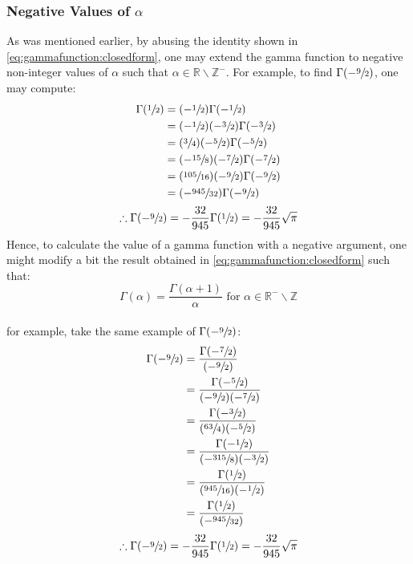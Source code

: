 \documentclass[12pt]{article}
\begin{document}
\subsubsection{Negative Values of $\alpha$}
As was mentioned earlier, by abusing the identity shown in \autoref{eq:gammafunction:closedform}, one may extend the
gamma function to negative non-integer values of $\alpha$ such that $\alpha\in\mathbb{R}\backslash\mathbb{Z}^-$. For
example, to find $\Gamma(-\sfrac{9}{2})$, one may compute:
\vspace*{-12pt}
\begin{equation}
	\begin{split}
		\Gamma(\sfrac{1}{2})	&=	(-\sfrac{1}{2})\Gamma(-\sfrac{1}{2})\\
								&=	(-\sfrac{1}{2})(-\sfrac{3}{2})\Gamma(-\sfrac{3}{2})\\
								&=	(\sfrac{3}{4})(-\sfrac{5}{2})\Gamma(-\sfrac{5}{2})\\
								&=	(-\sfrac{15}{8})(-\sfrac{7}{2})\Gamma(-\sfrac{7}{2})\\
								&=	(\sfrac{105}{16})(-\sfrac{9}{2})\Gamma(-\sfrac{9}{2})\\
								&=	(-\sfrac{945}{32})\Gamma(-\sfrac{9}{2})\\
	\end{split}
\end{equation}
\begin{equation}
	\therefore\Gamma(-\sfrac{9}{2})=-\frac{32}{945}\Gamma(\sfrac{1}{2})=-\frac{32}{945}\sqrt{\pi}
\end{equation}
Hence, to calculate the value of a gamma function with a negative argument, one might modify a bit the result obtained
in \autoref{eq:gammafunction:closedform} such that:
\vspace*{-12pt}
\begin{equation}
	\Gamma(\alpha)=\frac{\Gamma(\alpha+1)}{\alpha}\text{ for }\alpha\in\mathbb{R}^-\backslash\mathbb{Z}
\end{equation}\\[-36pt]
for example, take the same example of $\Gamma(-\sfrac{9}{2})$:\\[-12pt]
\begin{equation}
	\begin{split}
		\Gamma(-\sfrac{9}{2})	&=	\frac{\Gamma(-\sfrac{7}{2})}{(-\sfrac{9}{2})}\\
								&=	\frac{\Gamma(-\sfrac{5}{2})}{(-\sfrac{9}{2})(-\sfrac{7}{2})}\\
								&=	\frac{\Gamma(-\sfrac{3}{2})}{(\sfrac{63}{4})(-\sfrac{5}{2})}\\
								&=	\frac{\Gamma(-\sfrac{1}{2})}{(-\sfrac{315}{8})(-\sfrac{3}{2})}\\
								&=	\frac{\Gamma(\sfrac{1}{2})}{(\sfrac{945}{16})(-\sfrac{1}{2})}\\
								&=	\frac{\Gamma(\sfrac{1}{2})}{(-\sfrac{945}{32})}
		\end{split}
\end{equation}
\begin{equation}
	\therefore\Gamma(-\sfrac{9}{2})=-\frac{32}{945}\Gamma(\sfrac{1}{2})=-\frac{32}{945}\sqrt{\pi}
\end{equation}
\end{document}
